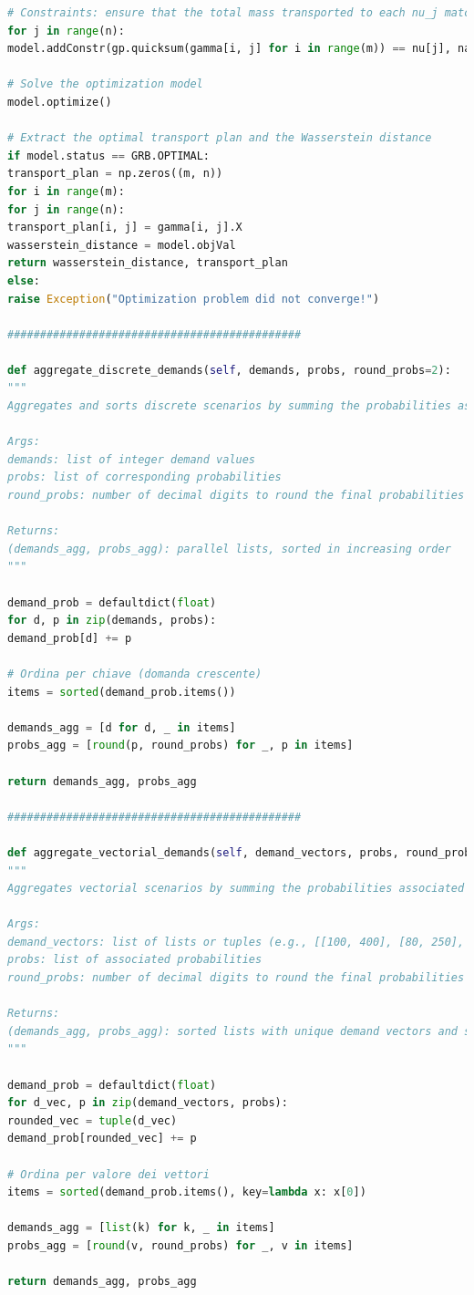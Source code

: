 \documentclass[a4paper,12pt]{article}
\begin{document}
\begin{lstlisting}[language=python,caption={class ScenarioTree},label={lst:class-scenario-tree}]
# Constraints: ensure that the total mass transported to each nu_j matches the corresponding mass in nu
for j in range(n):
model.addConstr(gp.quicksum(gamma[i, j] for i in range(m)) == nu[j], name=f"demand_{j}")

# Solve the optimization model
model.optimize()

# Extract the optimal transport plan and the Wasserstein distance
if model.status == GRB.OPTIMAL:
transport_plan = np.zeros((m, n))
for i in range(m):
for j in range(n):
transport_plan[i, j] = gamma[i, j].X
wasserstein_distance = model.objVal
return wasserstein_distance, transport_plan
else:
raise Exception("Optimization problem did not converge!")

#############################################

def aggregate_discrete_demands(self, demands, probs, round_probs=2):
"""
Aggregates and sorts discrete scenarios by summing the probabilities associated with identical demand values.

Args:
demands: list of integer demand values
probs: list of corresponding probabilities
round_probs: number of decimal digits to round the final probabilities

Returns:
(demands_agg, probs_agg): parallel lists, sorted in increasing order
"""

demand_prob = defaultdict(float)
for d, p in zip(demands, probs):
demand_prob[d] += p

# Ordina per chiave (domanda crescente)
items = sorted(demand_prob.items())

demands_agg = [d for d, _ in items]
probs_agg = [round(p, round_probs) for _, p in items]

return demands_agg, probs_agg

#############################################

def aggregate_vectorial_demands(self, demand_vectors, probs, round_probs=3):
"""
Aggregates vectorial scenarios by summing the probabilities associated with identical demand vectors,

Args:
demand_vectors: list of lists or tuples (e.g., [[100, 400], [80, 250], ...])
probs: list of associated probabilities
round_probs: number of decimal digits to round the final probabilities

Returns:
(demands_agg, probs_agg): sorted lists with unique demand vectors and summed probabilities
"""

demand_prob = defaultdict(float)
for d_vec, p in zip(demand_vectors, probs): 
rounded_vec = tuple(d_vec)
demand_prob[rounded_vec] += p

# Ordina per valore dei vettori
items = sorted(demand_prob.items(), key=lambda x: x[0])

demands_agg = [list(k) for k, _ in items]
probs_agg = [round(v, round_probs) for _, v in items]

return demands_agg, probs_agg
	
\end{lstlisting}
\end{document}
